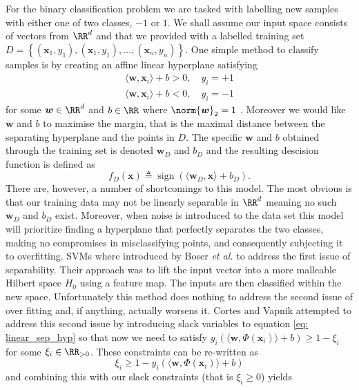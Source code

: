 For the binary classification problem we are tasked with labelling new samples with either one of two classes, $-1$ or $1$. We shall assume our input space consists of vectors from $\RR^d$ and that we provided with a labelled training set $D = \left\{ \left( \bm{x}_1 , y_1 \right), \left( \bm{x}_1 , y_1 \right), \ldots , \left( \bm{x}_n , y_n \right) \right\}$. One simple method to classify samples is by creating an affine linear hyperplane satisfying
\begin{align} \label{eq: linear_sep_hyp}
    \langle \bm{w}, \bm{x}_i \rangle + b > 0, \quad y_i = +1 \nonumber \\
    \langle \bm{w}, \bm{x}_i \rangle + b < 0, \quad y_i = -1
\end{align}
for some $\bm{w} \in \RR^d$ and $b \in \RR$ where $\norm{\bm{w}}_2 = 1$ \cite{SteinwartIngo2008SVMb}. Moreover we would like $\bm{w}$ and $b$ to maximise the margin, that is the maximal distance between the separating hyperplane and the points in $D$. The specific $\bm{w}$ and $b$ obtained through the training set is denoted $\bm{w}_D$ and $b_D$ and the resulting descision function is defined as
\[
    f_D \left( \bm{x} \right) \triangleq \operatorname{sign} \left( \langle \bm{w}_D , \bm{x} \rangle + b_D \right).
\]
There are, however, a number of shortcomings to this model. The most obvious is that our training data may not be linearly separable in $\RR^d$ meaning no such $\bm{w}_D$ and $b_D$ exist. Moreover, when noise is introduced to the data set this model will prioritize finding a hyperplane that perfectly separates the two classes, making no compromises in misclassifying points, and consequently subjecting it to overfitting. SVMs where introduced by Boser {\it et al.} \cite{BoserBernhard1992Ataf} to address the first issue of separability. Their approach was to lift the input vector into a more malleable Hilbert space $H_0$ using a feature map. The inputs are then classified within the new space. Unfortunately this method does nothing to address the second issue of over fitting and, if anything, actually worsens it. Cortes and Vapnik \cite{CortesCorinna1995SN} attempted to address this second issue by introducing slack variables to equation \ref{eq: linear_sep_hyp} so that now we need to satisfy $y_i \left( \langle \bm{w} , \Phi \left( \bm{x}_i \right) \rangle + b \right) \geq 1 - \xi_i$ for some $\xi_i \in \RR_{>0}$. These constraints can be re-written as
\[
    \xi_i \geq 1 - y_i \left( \langle \bm{w} , \Phi \left( \bm{x}_i \right) \rangle + b \right)
\]
and combining this with our slack constraints (that is $\xi_i \geq 0$) yields
